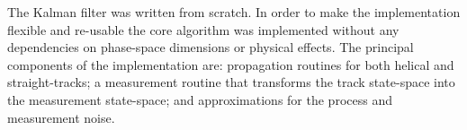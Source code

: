 % 



    The Kalman filter was written from scratch. In order to make the implementation flexible and re-usable the core algorithm was implemented without any dependencies on phase-space dimensions or physical effects. %
    The principal components of the implementation are: propagation routines for both helical and straight-tracks; a measurement routine that transforms the track state-space into the measurement state-space; and approximations for the process and measurement noise.
    

